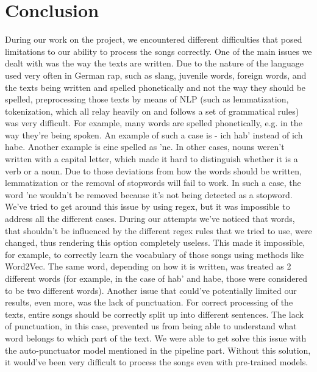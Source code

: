 \section{Conclusion}\label{sec:conclusion}

During our work on the project, we encountered different difficulties that posed limitations to our ability to process the songs correctly.
One of the main issues we dealt with was the way the texts are written. Due to the nature of the language used very often in German rap, such as slang, juvenile words, foreign words, and the texts being written and spelled phonetically and not the way they should be spelled, preprocessing those texts by means of NLP (such as lemmatization, tokenization, which all relay heavily on and follows a set of grammatical rules) was very difficult. For example, many words are spelled phonetically, e.g. in the way they're being spoken. An example of such a case is - ich hab' instead of ich habe. Another example is eine spelled as 'ne. In other cases, nouns weren't written with a capital letter, which made it hard to distinguish whether it is a verb or a noun.  Due to those deviations from how the words should be written, lemmatization or the removal of stopwords will fail to work. In such a case, the word 'ne wouldn't be removed because it's not being detected as a stopword. We've tried to get around this issue by using regex, but it was impossible to address all the different cases. During our attempts we've noticed that words, that shouldn't be influenced by the different regex rules that we tried to use, were changed, thus rendering this option completely useless.
This made it impossible, for example, to correctly learn the vocabulary of those songs using methods like Word2Vec. The same word, depending on how it is written, was treated as 2 different words (for example, in the case of hab' and habe, those were considered to be two different words).
Another issue that could've potentially limited our results, even more, was the lack of punctuation. For correct processing of the texts, entire songs should be correctly split up into different sentences. The lack of punctuation, in this case, prevented us from being able to understand what word belongs to which part of the text. We were able to get solve this issue with the auto-punctuator model mentioned in the pipeline part. Without this solution, it would've been very difficult to process the songs even with pre-trained models.
